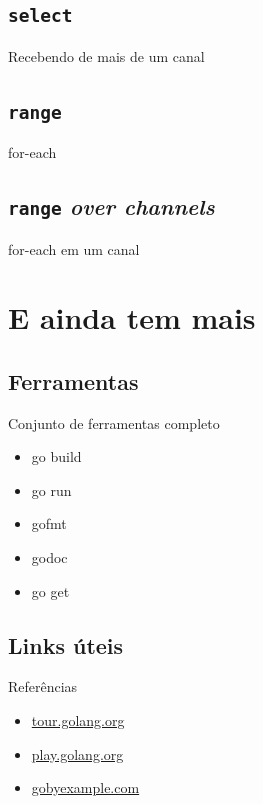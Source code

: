 \documentclass{beamer}
\begin{document}
\subsection{\tt select}
\begin{frame}
    {Recebendo de mais de um canal}
\end{frame}

\subsection{\tt range}
\begin{frame}
    {for-each}
\end{frame}

\subsection{{\tt range} {\em over channels}}
\begin{frame}
    {for-each em um canal}
\end{frame}

\section{E ainda tem mais}
\subsection{Ferramentas}
\begin{frame}
    {Conjunto de ferramentas completo}
    \begin{itemize}[<+->]
        \item go build
        \item go run
        \item gofmt
        \item godoc
        \item go get
    \end{itemize}
\end{frame}
\subsection{Links úteis}
\begin{frame}
    {Referências}
    \begin{itemize}
        \item \url{tour.golang.org}
        \item \url{play.golang.org}
        \item \url{gobyexample.com}
    \end{itemize}
\end{frame}
\end{document}
